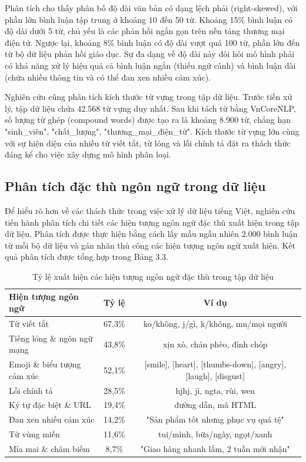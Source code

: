 \documentclass[14pt, a4paper]{report}
\begin{document}
Phân tích cho thấy phân bố độ dài văn bản có dạng lệch phải (right-skewed), với phần lớn bình luận tập trung ở khoảng 10 đến 50 từ. Khoảng 15\% bình luận có độ dài dưới 5 từ, chủ yếu là các phản hồi ngắn gọn trên nền tảng thương mại điện tử. Ngược lại, khoảng 8\% bình luận có độ dài vượt quá 100 từ, phần lớn đến từ bộ dữ liệu phản hồi giáo dục. Sự đa dạng về độ dài này đòi hỏi mô hình phải có khả năng xử lý hiệu quả cả bình luận ngắn (thiếu ngữ cảnh) và bình luận dài (chứa nhiều thông tin và có thể đan xen nhiều cảm xúc).


Nghiên cứu cũng phân tích kích thước từ vựng trong tập dữ liệu. Trước tiền xử lý, tập dữ liệu chứa 42.568 từ vựng duy nhất. Sau khi tách từ bằng VnCoreNLP, số lượng từ ghép (compound words) được tạo ra là khoảng 8.900 từ, chẳng hạn "sinh\_viên", "chất\_lượng", "thương\_mại\_điện\_tử". Kích thước từ vựng lớn cùng với sự hiện diện của nhiều từ viết tắt, từ lóng và lỗi chính tả đặt ra thách thức đáng kể cho việc xây dựng mô hình phân loại.


\subsection{Phân tích đặc thù ngôn ngữ trong dữ liệu}


Để hiểu rõ hơn về các thách thức trong việc xử lý dữ liệu tiếng Việt, nghiên cứu tiến hành phân tích chi tiết các hiện tượng ngôn ngữ đặc thù xuất hiện trong tập dữ liệu. Phân tích được thực hiện bằng cách lấy mẫu ngẫu nhiên 2.000 bình luận từ mỗi bộ dữ liệu và gán nhãn thủ công các hiện tượng ngôn ngữ xuất hiện. Kết quả phân tích được tổng hợp trong Bảng 3.3.


\begin{table}[h]
\centering
\caption{Tỷ lệ xuất hiện các hiện tượng ngôn ngữ đặc thù trong tập dữ liệu}
\begin{tabular}{|l|c|c|}
\hline
\textbf{Hiện tượng ngôn ngữ} & \textbf{Tỷ lệ} & \textbf{Ví dụ} \\
\hline
Từ viết tắt & 67,3\% & ko/không, j/gì, k/không, mn/mọi người \\
\hline
Tiếng lóng \& ngôn ngữ mạng & 43,8\% & xịn xò, chán phèo, đỉnh chóp \\
\hline
Emoji \& biểu tượng cảm xúc & 52,1\% & [smile], [heart], [thumbs-down], [angry], [laugh], [disgust] \\
\hline
Lỗi chính tả & 28,5\% & hjhj, jì, ngta, rùi, wen \\
\hline
Ký tự đặc biệt \& URL & 19,4\% & đường dẫn, mã HTML \\
\hline
Đan xen nhiều cảm xúc & 14,2\% & "Sản phẩm tốt nhưng phục vụ quá tệ" \\
\hline
Từ vùng miền & 11,6\% & tui/mình, bữa/ngày, ngọt/xanh \\
\hline
Mỉa mai \& châm biếm & 8,7\% & "Giao hàng nhanh lắm, 2 tuần mới nhận" \\
\hline
\end{tabular}
\normalsize
\end{table}
\end{document}

